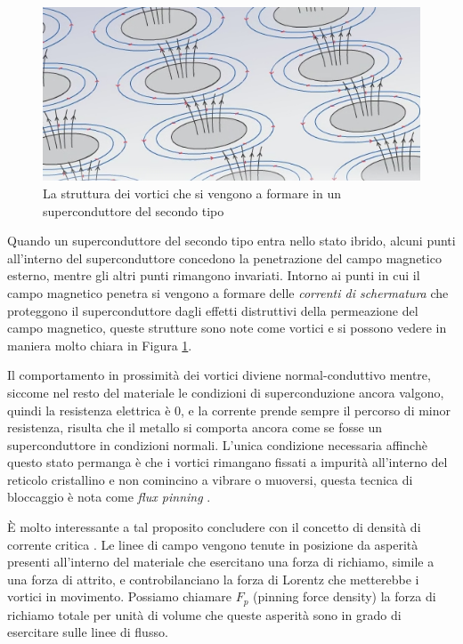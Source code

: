 \documentclass[a4paper,10pt]{article}
\begin{document}
\begin{figure}[h!]
	\centering

	\includegraphics[scale=0.35]{fig/vortex.png}
	\caption{
		La struttura dei vortici che si vengono a formare in un superconduttore del secondo tipo \cite{typ2-cambridge}
	}\label{fig:vortices}
\end{figure}

Quando un superconduttore del secondo tipo entra nello stato ibrido, alcuni punti all'interno del superconduttore concedono la penetrazione del campo magnetico esterno, mentre gli altri punti rimangono invariati. Intorno ai punti in cui il campo magnetico penetra si vengono a formare delle \emph{correnti di schermatura} che proteggono il superconduttore dagli effetti distruttivi della permeazione del campo magnetico, queste strutture sono note come vortici e si possono vedere in maniera molto chiara in Figura \ref{fig:vortices}.

Il comportamento in prossimità dei vortici diviene normal-conduttivo mentre, siccome nel resto del materiale le condizioni di superconduzione ancora valgono, quindi la resistenza elettrica è $0$, e la corrente prende sempre il percorso di minor resistenza, risulta che il metallo si comporta ancora come se fosse un superconduttore in condizioni normali. L'unica condizione necessaria affinchè questo stato permanga è che i vortici rimangano fissati a impurità all'interno del reticolo cristallino e non comincino a vibrare o muoversi, questa tecnica di bloccaggio è nota come \emph{flux pinning} \cite{flux-pinning}.

È molto interessante a tal proposito concludere con il concetto di densità di corrente critica \cite{mat-pinning}. Le linee di campo vengono tenute in posizione da asperità presenti all'interno del materiale che esercitano una forza di richiamo, simile a una forza di attrito, e controbilanciano la forza di Lorentz che metterebbe i vortici in movimento. Possiamo chiamare $F_p$ (pinning force density) la forza di richiamo totale per unità di volume che queste asperità sono in grado di esercitare sulle linee di flusso.
\end{document}
